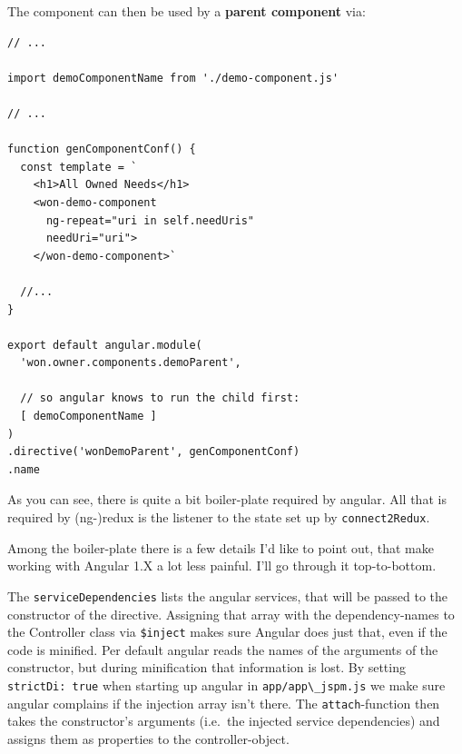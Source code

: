 \documentclass[a4paper,,tablecaptionabove]{scrbook}
\newcommand{\passthrough}[1]{#1}
\begin{document}
The component can then be used by a \textbf{parent component} via:

\begin{lstlisting}[caption={Usage in parent component.}, label=fig:usage-in-parent-component]
// ...

import demoComponentName from './demo-component.js'

// ...

function genComponentConf() {
  const template = `
    <h1>All Owned Needs</h1>
    <won-demo-component
      ng-repeat="uri in self.needUris"
      needUri="uri">
    </won-demo-component>`

  //...
}

export default angular.module(
  'won.owner.components.demoParent',

  // so angular knows to run the child first:
  [ demoComponentName ]
)
.directive('wonDemoParent', genComponentConf)
.name
\end{lstlisting}

As you can see, there is quite a bit boiler-plate required by angular.
All that is required by (ng-)redux is the listener to the state set up
by \passthrough{\lstinline!connect2Redux!}.

Among the boiler-plate there is a few details I'd like to point out,
that make working with Angular 1.X a lot less painful. I'll go through
it top-to-bottom.

The \passthrough{\lstinline!serviceDependencies!} lists the angular
services, that will be passed to the constructor of the directive.
Assigning that array with the dependency-names to the Controller class
via \passthrough{\lstinline!$inject!} makes sure Angular does just that,
even if the code is minified. Per default angular reads the names of the
arguments of the constructor, but during minification that information
is lost. By setting \passthrough{\lstinline!strictDi: true!} when
starting up angular in \passthrough{\lstinline!app/app\_jspm.js!} we
make sure angular complains if the injection array isn't there. The
\passthrough{\lstinline!attach!}-function then takes the constructor's
arguments (i.e.~the injected service dependencies) and assigns them as
properties to the controller-object.
\end{document}
